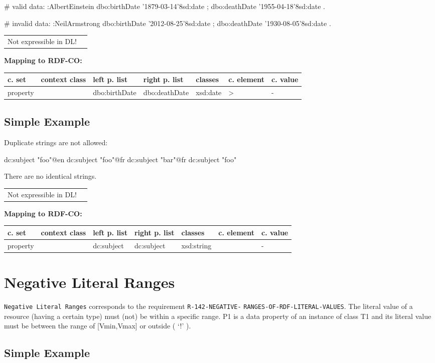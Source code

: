 \documentclass{llncs}
\newcommand{\ms}[1]{\texttt{#1}}
\newenvironment{gcotable}{
  \scriptsize
  \sffamily
  \vspace{0cm}
	\begin{center}
	\textbf{\vspace{0.4cm}Mapping to RDF-CO:} \\
  \begin{tabular}{l|l|l|l|l|l|l}
	\hline
  \textbf{c. set} & \textbf{context class} & \textbf{left p. list} & \textbf{right p. list} & \textbf{classes} & \textbf{c. element} & \textbf{c. value} \\
  \hline

}{
  \hline
  \end{tabular}
	\end{center}
}
\newenvironment{DL}{
\vspace{0cm}
	\begin{center}
  \begin{tabular}{r l}

}{
  \end{tabular}
	\end{center}
}
\begin{document}
\begin{ex}
# valid data:
:AlbertEinstein
    dbo:birthDate '1879-03-14'^^xsd:date ;
    dbo:deathDate '1955-04-18'^^xsd:date .
\end{ex}

\begin{ex}
# invalid data:
:NeilArmstrong
    dbo:birthDate '2012-08-25'^^xsd:date ;
    dbo:deathDate '1930-08-05'^^xsd:date .
\end{ex}

\begin{DL}
Not expressible in DL!
\end{DL}

\begin{gcotable}
property &  & dbo:birthDate & dbo:deathDate & xsd:date & \textgreater & - \\
\end{gcotable}

\subsection{Simple Example}

Duplicate strings are not allowed:

\begin{ex}
dc:subject "foo"@en
dc:subject "foo"@fr
dc:subject "bar"@fr
dc:subject "foo"
\end{ex}

There are no identical strings.

\begin{DL}
Not expressible in DL!
\end{DL}

\begin{gcotable}
property &  & dc:subject & dc:subject & xsd:string &  & - \\
\end{gcotable}

\section{Negative Literal Ranges}

\ms{Negative Literal Ranges} corresponds to the requirement
\ms{R-142-NEGATIVE-} \ms{RANGES-OF-RDF-LITERAL-VALUES}.
The literal value of a resource (having a certain type) must (not) be within a specific range.
P1 is a data property of an instance of class T1 and its literal value must be between the range of [Vmin,Vmax] or outside ( ‘!' ).

\subsection{Simple Example}
\end{document}
